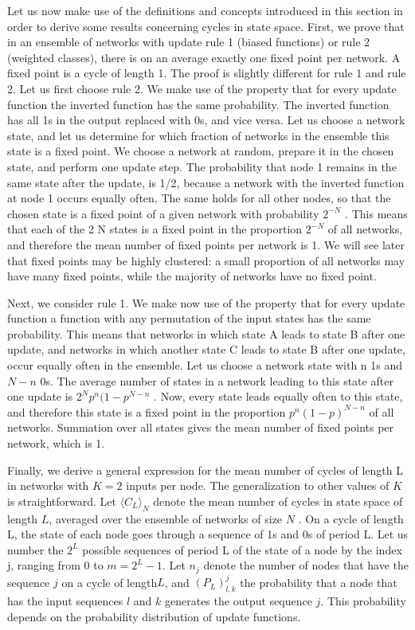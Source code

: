 Let us now make use of the definitions and concepts
introduced in this section in order to derive some results
concerning cycles in state space. First, we prove that in
an ensemble of networks with update rule 1 (biased functions) or rule 2 (weighted classes), there is on an average
exactly one fixed point per network. A fixed point is a
cycle of length 1. The proof is slightly different for rule
1 and rule 2. Let us first choose rule 2. We make use of
the property that for every update function the inverted
function has the same probability. The inverted function
has all 1s in the output replaced with 0s, and vice versa.
Let us choose a network state, and let us determine for
which fraction of networks in the ensemble this state is a
fixed point. We choose a network at random, prepare it
in the chosen state, and perform one update step. The
probability that node 1 remains in the same state after
the update, is 1/2, because a network with the inverted
function at node 1 occurs equally often. The same holds
for all other nodes, so that the chosen state is a fixed
point of a given network with probability $2^{−N}$ . This
means that each of the 2 N states is a fixed point in the
proportion $2^{−N}$ of all networks, and therefore the mean
number of fixed points per network is 1. We will see
later that fixed points may be highly clustered: a small
proportion of all networks may have many fixed points,
while the majority of networks have no fixed point.


Next, we consider rule 1. We make now use of the
property that for every update function a function with
any permutation of the input states has the same probability. This means that networks in which state A leads
to state B after one update, and networks in which another state C leads to state B after one update, occur
equally often in the ensemble. Let us choose a network
state with n 1s and $N − n$ 0s. The average number of
states in a network leading to this state after one update
is $2^N p^n (1 − p^{N −n}$ . Now, every state leads equally often
to this state, and therefore this state is a fixed point in
the proportion $p^n (1 − p)^{N−n}$ of all networks. Summation
over all states gives the mean number of fixed points per
network, which is 1.

Finally, we derive a general expression for the mean
number of cycles of length L in networks with $K = 2$
inputs per node. The generalization to other values of $K$
is straightforward. Let $\langle C_L\rangle_N$ denote the mean number
of cycles in state space of length $L$, averaged over the
ensemble of networks of size $N$ . On a cycle of length
L, the state of each node goes through a sequence of
1s and 0s of period L. Let us number the $2^L$ possible
sequences of period L of the state of a node by the index
j, ranging from 0 to $m = 2^L − 1$. Let $n_j$ denote the
number of nodes that have the sequence $j$ on a cycle of
length$ L$, and $(P_L )^j_{l,k}$ the probability that a node that
has the input sequences $l$ and $k$ generates the output
sequence $j$. This probability depends on the probability distribution of update functions.




